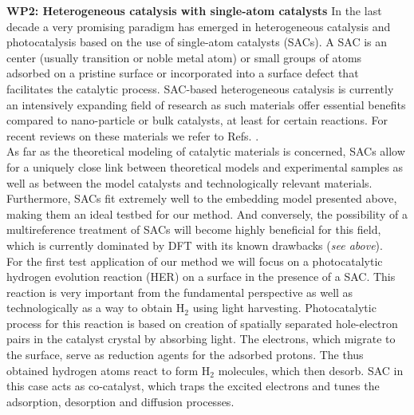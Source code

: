 \documentclass[a4paper,11pt,headings=normal]{scrartcl}
\begin{document}
\noindent
\textbf{WP2: Heterogeneous catalysis with single-atom catalysts}
In the last decade a very promising paradigm has emerged in heterogeneous 
catalysis and photocatalysis based on the use of single-atom catalysts (SACs). A 
SAC is an center (usually transition or noble metal atom) or small groups of atoms 
adsorbed on a pristine surface or incorporated into a surface defect that 
facilitates the catalytic process. SAC-based heterogeneous catalysis is currently 
an intensively expanding field of research as such materials offer essential 
benefits compared to nano-particle or bulk catalysts, at least for certain 
reactions. For recent reviews on these materials we refer to Refs. 
\cite{Wu_2025,Kment_2024,Li_2024}.\\
As far as the theoretical 
modeling of catalytic materials is concerned, SACs allow for a uniquely close link 
between theoretical models and experimental samples as well as between the model 
catalysts and technologically relevant materials. Furthermore, SACs fit extremely 
well to the embedding model presented above, making them an ideal testbed for our 
method. And conversely, the possibility of a multireference treatment of SACs will 
become highly beneficial for this field, which is currently dominated by DFT with 
its known drawbacks (\textit{see above}).\\
For the first test application of our method we will focus on a photocatalytic hydrogen evolution reaction (HER) on a surface in the presence of a SAC. This reaction is very important from the fundamental perspective as well as technologically as a way to obtain H$_2$ using light harvesting. Photocatalytic process for this reaction\autocite{Ferriday_2021,Wu_2025} is based on creation of spatially separated hole-electron pairs in the catalyst crystal by absorbing light. The electrons, which migrate to the surface, serve as reduction agents for the adsorbed protons. The thus obtained hydrogen atoms react to form H$_2$ molecules, which then desorb. SAC in this case acts as co-catalyst, which traps the excited electrons and tunes the adsorption, desorption and diffusion processes.\\
\end{document}
